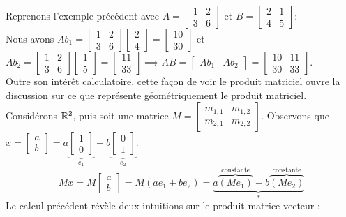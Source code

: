 \noindent Reprenons l'exemple précédent avec $A = \begin{bmatrix} 1 & 2 \\ 3 & 6 \end{bmatrix}$ et $B = \begin{bmatrix} 2 & 1 \\ 4 & 5 \end{bmatrix}$: \\
Nous avons $Ab_1 = \begin{bmatrix} 1 & 2 \\ 3 & 6 \end{bmatrix} \begin{bmatrix} 2 \\ 4\end{bmatrix} = \begin{bmatrix} 10 \\ 30 \end{bmatrix}$ et $Ab_2 = \begin{bmatrix} 1 & 2 \\ 3 & 6 \end{bmatrix} \begin{bmatrix} 1 \\ 5\end{bmatrix} = \begin{bmatrix} 11 \\ 33 \end{bmatrix} \implies AB = \begin{bmatrix} Ab_1 & Ab_2 \end{bmatrix} = \begin{bmatrix} 10 & 11 \\ 30 & 33 \end{bmatrix}$. \\

\noindent Outre son intérêt calculatoire, cette façon de voir le produit matriciel ouvre la discussion sur ce que représente géométriquement le produit matriciel.\\
Considérons $\mathbb{R}^2$, puis soit une matrice $M = \begin{bmatrix}
m_{1,1} & m_{1,2} \\ m_{2,1} & m_{2,2}
\end{bmatrix}$. Observons que $x = \begin{bmatrix}a \\ b \end{bmatrix} = a\underbrace{\begin{bmatrix}1 \\ 0 \end{bmatrix}}_{e_1}+b\underbrace{\begin{bmatrix}0 \\ 1 \end{bmatrix}}_{e_2}$.\\
$$Mx = M\begin{bmatrix}a \\ b \end{bmatrix} = M\left(ae_1 + be_2\right) = \underbrace{a\overbrace{(Me_1)}^{\text{constante}} + b\overbrace{(Me_2)}^{\text{constante}}}_{*} $$
Le calcul précédent révèle deux intuitions sur le produit matrice-vecteur :\\

